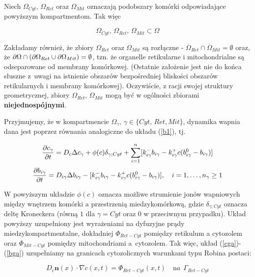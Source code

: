 \medskip 

Niech $\Omega_{Cyt}, \, \Omega_{Ret}$ oraz $\Omega_{Mit}$ oznaczają podobszary komórki odpowiadające powyższym kompartmentom. Tak więc 

\[ \Omega_{Cyt}, \, \Omega_{Ret}, \, \Omega_{Mit} \subset \Omega \] 

\noindent Zakładamy również, że zbiory $\Omega_{Ret}$ oraz $\Omega_{Mit}$ są rozłączne - 
$\overline{\Omega}_{Ret} \cap \overline{\Omega}_{Mit} = \emptyset$ oraz, że 
$\partial \Omega \cap (\partial \Omega_{Ret} \cup \partial \Omega_{Mit}) = \emptyset$, tzn. że 
organelle retikularne i mitochondrialne są odseparowane od membrany komórkowej. (Ostatnie założenie jest nie do końca słuszne z~uwagi na istnienie obszarów bezpośredniej bliskości obszarów retikularnych i membrany komórkowej). Oczywiście, z racji swojej struktury geometrycznej, zbiory $\Omega_{Ret}, \, \Omega_{Mit}$ mogą być w ogólności zbiorami \textbf{niejednospójnymi}. 

Przyjmujemy, że w kompartmencie $\Omega_\gamma$, $\gamma \in \{{Cyt},\,{Ret},{Mit}\}$, dynamika wapnia dana jest poprzez równania analogiczne do układu (\ref{b1}), tj.

\begin{equation} \label{cga}
{\displaystyle
	\frac{\partial c_\gamma}{\partial t} = D_c \Delta c_\gamma + \phi(c) \delta_{\gamma;Cyt} + 
	\sum_{i=1}^n [ k^{-}_{i\gamma} b_{i\gamma} - k^{+}_{i\gamma} c (b^0_{i\gamma} -b_{i\gamma})]
}
\end{equation}
\begin{equation} \label{bga}
{\displaystyle
	\frac{\partial{b}_{i\gamma}}{\partial t} = D_{i\gamma}  \Delta b_{i\gamma} 
	- [k^{-}_{i\gamma} b_{i\gamma} - k^{+}_{i\gamma} c (b^0_{i\gamma} -b_{i\gamma})], \quad i=1,\ldots,n_\gamma \geq 1
}
\end{equation}

\noindent W powyższym układzie $\phi(c)$ oznacza możliwe strumienie jonów wapniowych między wnętrzem komórki a przestrzenią miedzykomórkową, gdzie $\delta_{\gamma;Cyt}$ oznacza deltę Kroneckera (równą $1$ dla $\gamma=Cyt$ oraz $0$ w przeciwnym przypadku). Układ powyższy uzupełniony jest wyrażeniami na dyfuzyjne prądy miedzykompartmentalne, dokładniej $\Phi_{Ret-Cyt}$ pomiędzy retikulum a cytozolem oraz $\Phi_{Mit-Cyt}$ pomiędzy mitochondriami a~cytozolem. Tak więc, układ (\ref{cga})-(\ref{bga}) uzupełniamy na granicach cytozolicznych warunkami typu Robina postaci: 

\begin{equation} \label{RCW}
D_c \boldsymbol{n}(x) \cdot \nabla c(x,t) = \Phi_{Ret-Cyt}(x,t) \quad {\mathrm na} ~~ \Gamma_{Ret-Cyt} 
\end{equation}

